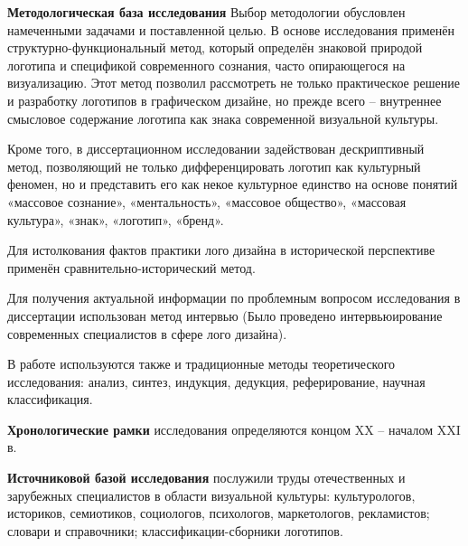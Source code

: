\textbf{Методологическая база исследования} 
Выбор методологии обусловлен намеченными задачами и поставленной целью. В основе исследования применён структурно-функциональный метод, который определён знаковой природой логотипа и спецификой современного сознания, часто опирающегося на визуализацию. Этот метод позволил рассмотреть не только практическое решение и разработку логотипов в графическом дизайне, но прежде всего – внутреннее смысловое содержание логотипа как знака современной визуальной культуры.

Кроме того, в диссертационном исследовании задействован дескриптивный метод, позволяющий не только дифференцировать логотип как культурный феномен, но и представить его как некое культурное единство на основе понятий «массовое сознание», «ментальность», «массовое общество», «массовая культура», «знак», «логотип», «бренд».

Для истолкования фактов практики лого дизайна в исторической перспективе применён сравнительно-исторический метод.

Для получения актуальной информации по проблемным вопросом исследования в диссертации использован метод интервью (Было проведено интервьюирование современных специалистов в сфере лого дизайна).

В работе используются также и традиционные методы теоретического исследования: анализ, синтез, индукция, дедукция, реферирование, научная классификация.

\textbf{Хронологические рамки} исследования определяются концом XX – началом XXI в.

\textbf{Источниковой базой исследования} послужили труды отечественных и зарубежных специалистов в области визуальной культуры: культурологов, историков, семиотиков, социологов, психологов, маркетологов, рекламистов; словари и справочники; классификации-сборники логотипов.

